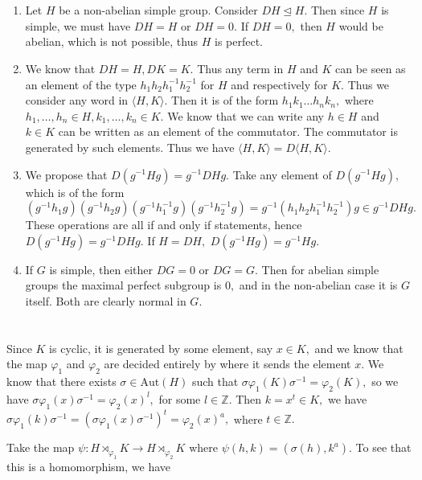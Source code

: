 \documentclass{article}
\begin{document}
\section{} %
\begin{enumerate}
	\item Let $H$ be a non-abelian simple group. Consider $DH \trianglelefteq H.$ Then since $H$ is simple, we must have $DH= H$ or $DH=0.$ If $DH=0,$ then 
	$H$ would be abelian, which is not possible, thus $H$ is perfect.
	\item We know that $DH=H, DK=K.$ Thus any term in $H$ and $K$ can be seen as an element of the type $h_1h_2h_1^{-1}h_2^{-1}$ for $H$ and respectively 
	for $K.$ Thus we consider any word in $\langle H,K \rangle.$ Then it is of the form $h_1k_1 \dots h_n k_n,$ where $h_1,\dots, h_n \in H, k_1,\dots, k_n 
	\in K.$ We know that we can write any $h \in H$ and $k \in K$ can be written as an element of the commutator. The commutator is generated by such 
	elements. Thus we have $\langle H,K \rangle= D\langle H,K \rangle.$ 
	
	\item We propose that $D(g^{-1}Hg)=g^{-1}DHg.$ Take any element of $D(g^{-1}Hg),$ which is of the form 
	$(g^{-1}h_1g)(g^{-1}h_2g)(g^{-1}h_1^{-1}g)(g^{-1}h_2^{-1}g)=g^{-1}(h_1h_2h_1^{-1}h_2^{-1})g \in g^{-1}DHg.$ These operations are all if and only if 
	statements, hence $D(g^{-1}Hg)=g^{-1}DHg.$ If $H=DH,$ $D(g^{-1}Hg)=g^{-1}Hg.$
	\item If $G$ is simple, then either $DG=0$ or $DG=G.$ Then for abelian simple groups the maximal perfect subgroup is $0,$ and in the non-abelian case it 
	is $G$ itself. Both are clearly normal in $G.$ 
\end{enumerate}
\section{} %
Since $K$ is cyclic, it is generated by some element, say $x \in K,$ and we know that the map $\varphi_1$ and $\varphi_2$ are decided entirely by where it 
sends the element $x.$ We know that there exists $\sigma \in \text{Aut}(H)$ such that $\sigma \varphi_1(K) \sigma^{-1}= \varphi_2(K),$ so we have
$\sigma \varphi_1(x) \sigma^{-1} = \varphi_2(x)^l,$ for some $l \in \mathbb{Z}.$ Then $k=x^t \in K,$ we have $\sigma \varphi_1(k) \sigma^{-1}=(\sigma 
\varphi_1(x) \sigma^{-1})^t= \varphi_2(x)^{a},$ where $t \in \mathbb{Z}.$  

Take the map $\psi: H \rtimes_{\varphi_1} K \to H \rtimes_{\varphi_2} K$ where $\psi(h,k)=(\sigma(h),k^a).$ To see that this is a homomorphism, we have 
\end{document}

